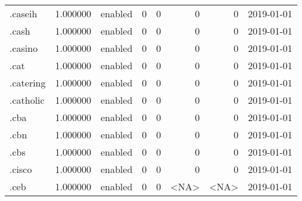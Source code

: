 \begin{tabular}{lrlrrrrl}
.caseih                   &          1.000000 &         enabled &                           0 &                           0 &                           0 &                   0 &           2019-01-01 \\
.cash                     &          1.000000 &         enabled &                           0 &                           0 &                           0 &                   0 &           2019-01-01 \\
.casino                   &          1.000000 &         enabled &                           0 &                           0 &                           0 &                   0 &           2019-01-01 \\
.cat                      &          1.000000 &         enabled &                           0 &                           0 &                           0 &                   0 &           2019-01-01 \\
.catering                 &          1.000000 &         enabled &                           0 &                           0 &                           0 &                   0 &           2019-01-01 \\
.catholic                 &          1.000000 &         enabled &                           0 &                           0 &                           0 &                   0 &           2019-01-01 \\
.cba                      &          1.000000 &         enabled &                           0 &                           0 &                           0 &                   0 &           2019-01-01 \\
.cbn                      &          1.000000 &         enabled &                           0 &                           0 &                           0 &                   0 &           2019-01-01 \\
.cbs                      &          1.000000 &         enabled &                           0 &                           0 &                           0 &                   0 &           2019-01-01 \\
.cisco                    &          1.000000 &         enabled &                           0 &                           0 &                           0 &                   0 &           2019-01-01 \\
.ceb                      &          1.000000 &         enabled &                           0 &                           0 &                        <NA> &                <NA> &           2019-01-01 \\

\end{tabular}
